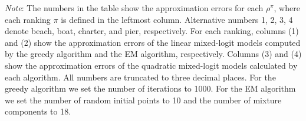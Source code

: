 \begin{table}[ht]
\begin{center}
  \caption{Approximation errors to  $\rho^{\pi}$}\label{tbl:fish_apx_error1}
\end{center}
\begin{scriptsize}
\textit{Note}: The numbers in the table show the approximation errors for each $\rho^{\pi}$, where each ranking $\pi$ is defined in the leftmost column. Alternative numbers 1, 2, 3, 4 denote beach, boat, charter, and pier, respectively. For each ranking, columns (1) and (2) show the approximation errors of the linear mixed-logit models computed by the greedy algorithm and the EM algorithm, respectively. Columns (3) and (4) show the approximation errors of the quadratic mixed-logit models calculated by each algorithm. All numbers are truncated to three decimal places. For the greedy algorithm we set the number of iterations to 1000. For the EM algorithm we set the number of random initial points to 10 and the number of mixture components to 18.
\end{scriptsize}
\end{table}
